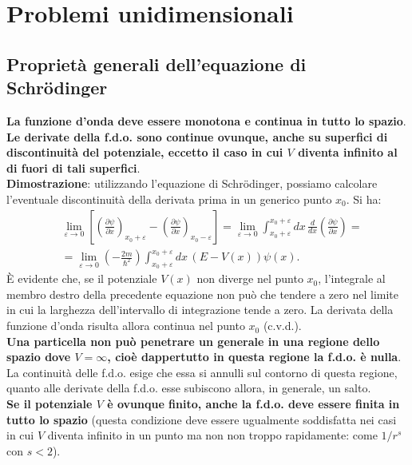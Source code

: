 \chapter{Problemi unidimensionali}
\section{Proprietà generali dell'equazione di Schr\"{o}dinger}
\textbf{La funzione d'onda deve essere monotona e continua in tutto lo spazio}. \textbf{Le derivate della f.d.o. sono continue ovunque, anche su superfici di discontinuità del potenziale, eccetto il caso in cui $V$ diventa infinito al di fuori di tali superfici}.\\

\textbf{Dimostrazione}: utilizzando l'equazione di Schr\"{o}dinger, possiamo calcolare l'eventuale discontinuità della derivata prima in un generico punto $x_0$. Si ha:
	\begin{align}
		& \lim _{\varepsilon \rightarrow 0} \left[ \left(\frac{\partial \psi}{\partial x}\right) _{x_0+\varepsilon}-\left(\frac{\partial \psi}{\partial x}\right) _{x_0-\varepsilon}\right]= \lim _{\varepsilon \rightarrow 0} \int _{x_0+\varepsilon} ^{x_0+\varepsilon} dx\, \frac{d}{dx}\left(\frac{\partial\psi}{\partial x}\right)=\nonumber\\
		&= \lim _{\varepsilon \rightarrow 0} \left(-\frac{2m}{\hbar ^2}\right)\int _{x_0+\varepsilon} ^{x_0+\varepsilon} dx\, \left(E-V\left( x\right)\right)\psi \left( x \right) .
	\end{align}
È evidente che, se il potenziale $V(x)$ non diverge nel punto $x_0$, l'integrale al membro destro della precedente equazione non può che tendere a zero nel limite in cui la larghezza dell'intervallo di integrazione tende a zero. La derivata della funzione d'onda risulta allora continua nel punto $x_0$ (c.v.d.).\\

\textbf{Una particella non può penetrare un generale in una regione dello spazio dove $V =\infty$, cioè dappertutto in questa regione la f.d.o. è nulla}. La continuità delle f.d.o. esige che essa si annulli sul contorno di questa regione, quanto alle derivate della f.d.o. esse subiscono allora, in generale, un salto.\\

\textbf{Se il potenziale $V$ è ovunque finito, anche la f.d.o. deve essere finita in tutto lo spazio} (questa condizione deve essere ugualmente soddisfatta nei casi in cui $V$ diventa infinito in un punto ma non non troppo rapidamente: come $1/r^s$ con $s<2$).\\

